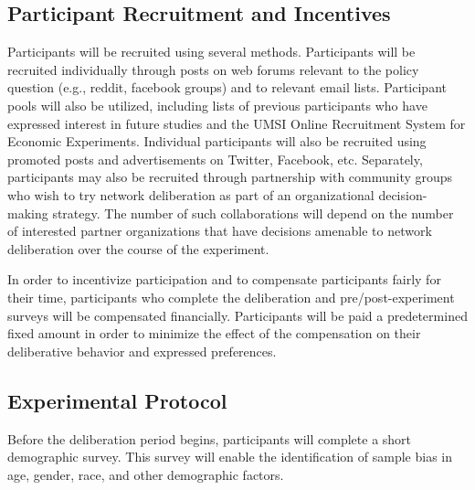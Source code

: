 \subsection{Participant Recruitment and Incentives}
Participants will be recruited using several methods.
Participants will be recruited individually through posts on web forums
relevant to the policy question (e.g., reddit, facebook groups)
and to relevant email lists.
Participant pools will also be utilized,
including lists of previous participants
who have expressed interest in future studies
and the UMSI Online Recruitment System for Economic Experiments.
Individual participants will also be recruited using promoted posts and
advertisements on Twitter, Facebook, etc.
Separately, participants may also be recruited through partnership with
community groups who wish to try network deliberation as part of an organizational
decision-making strategy.
The number of such collaborations will depend on the number of interested
partner organizations that have decisions amenable to network deliberation
over the course of the experiment.

In order to incentivize participation and to compensate participants fairly
for their time,
participants who complete the deliberation and pre/post-experiment surveys
will be compensated financially.
Participants will be paid a predetermined fixed amount in order to
minimize the effect of the compensation on their deliberative behavior and
expressed preferences.


\subsection{Experimental Protocol}

Before the deliberation period begins,
participants will complete a short demographic survey.
This survey will enable the identification of sample bias in age, gender, race,
and other demographic factors.

